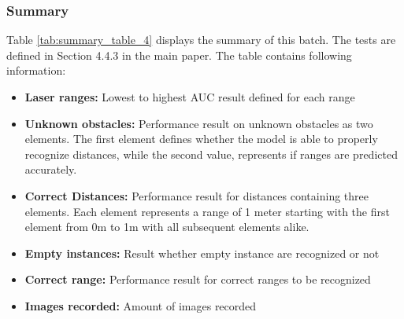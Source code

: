 \subsubsection{Summary\label{summary_batch_4} }
Table \ref{tab:summary_table_4} displays the summary of this batch. The tests are defined in Section 4.4.3 in the main paper. The table contains following information:
\begin{itemize}
\item  \textbf{Laser ranges: }Lowest to highest AUC result defined for each range
\item  \textbf{Unknown obstacles: }Performance result on unknown obstacles as two elements. The first element defines whether the model is able to properly recognize distances, while the second value, represents if ranges are predicted accurately.
\item  \textbf{Correct Distances: }Performance result for distances containing three elements. Each element represents a range of 1 meter starting with the first element from 0m to 1m with all subsequent elements alike.
\item  \textbf{Empty instances: }Result whether empty instance are recognized or not
\item  \textbf{Correct range: }Performance result for correct ranges to be recognized
\item  \textbf{Images recorded: }Amount of images recorded
\end{itemize}

